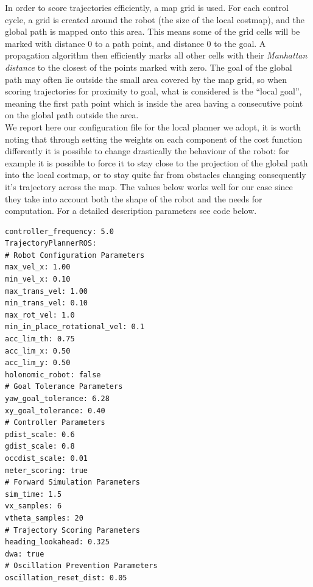 In order to score trajectories efficiently, a map grid is used. For each
control cycle, a grid is created around the robot (the size of the local costmap),
and the global path is mapped onto this area. This means some of the grid
cells will be marked with distance 0 to a path point, and distance 0 to the
goal. A propagation algorithm then efficiently marks all other cells with their
\textit{Manhattan distance} to the closest of the points marked with zero. The goal
of the global path may often lie outside the small area covered by the map
grid, so when scoring trajectories for proximity to goal, what is considered is
the “local goal”, meaning the first path point which is inside the area having
a consecutive point on the global path outside the area.
\\
We report here our configuration file for the local planner we adopt, it is
worth noting that through setting the weights on each component of the cost
function differently it is possible to change drastically the behaviour of the
robot: for example it is possible to force it to stay close to the projection of
the global path into the local costmap, or to stay quite far from obstacles
changing consequently it’s trajectory across the map. The values below works
well for our case since they take into account both the shape of the robot
and the needs for computation. For a detailed description parameters see code below.
\begin{lstlisting}
controller_frequency: 5.0
TrajectoryPlannerROS:
# Robot Configuration Parameters
max_vel_x: 1.00
min_vel_x: 0.10
max_trans_vel: 1.00
min_trans_vel: 0.10
max_rot_vel: 1.0
min_in_place_rotational_vel: 0.1
acc_lim_th: 0.75
acc_lim_x: 0.50
acc_lim_y: 0.50
holonomic_robot: false
# Goal Tolerance Parameters
yaw_goal_tolerance: 6.28
xy_goal_tolerance: 0.40
# Controller Parameters 
pdist_scale: 0.6
gdist_scale: 0.8
occdist_scale: 0.01 
meter_scoring: true
# Forward Simulation Parameters
sim_time: 1.5
vx_samples: 6
vtheta_samples: 20
# Trajectory Scoring Parameters
heading_lookahead: 0.325
dwa: true
# Oscillation Prevention Parameters
oscillation_reset_dist: 0.05
\end{lstlisting}

